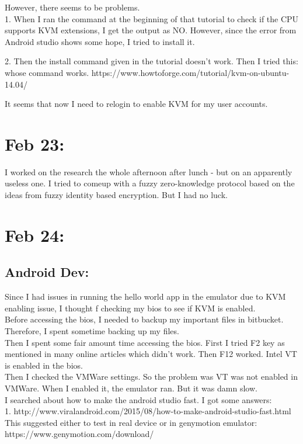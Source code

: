 \documentclass[11pt]{article}
\begin{document}
However, there seems to be problems. \\
1. When I ran the command at the beginning of that tutorial to check if the CPU supports KVM extensions, I get 
the output as NO. However, since the error from Android studio shows some hope, I tried to install it.

2. Then the install command given in the tutorial doesn't work. Then I tried this: whose command works. 
https://www.howtoforge.com/tutorial/kvm-on-ubuntu-14.04/

It seems that now I need to relogin to enable KVM for my user accounts. 

\section*{Feb 23:}
I worked on the research the whole afternoon after lunch - but on an apparently useless one. I tried to comeup with a fuzzy zero-knowledge protocol 
based on the ideas from fuzzy identity based encryption. But I had no luck.

\section*{Feb 24:}
\subsection*{Android Dev:}
Since I had issues in running the hello world app in the emulator due to KVM enabling issue, I thought f checking my bios to see if KVM is enabled.\\
Before accessing the bios, I needed to backup my important files in bitbucket. Therefore, I spent sometime backing up my files.\\
Then I spent some fair amount time accessing the bios. First I tried F2 key as mentioned in many online articles which didn't work. Then F12 worked. 
Intel VT is enabled in the bios.\\
Then I checked the VMWare settings. So the problem was VT was not enabled in VMWare. When I enabled it, the emulator ran. But it was damn slow.\\

I searched about how to make the android studio fast. I got some answers:\\
1. http://www.viralandroid.com/2015/08/how-to-make-android-studio-fast.html\\
This suggested either to test in real device or in genymotion emulator: https://www.genymotion.com/download/\\
\end{document}
